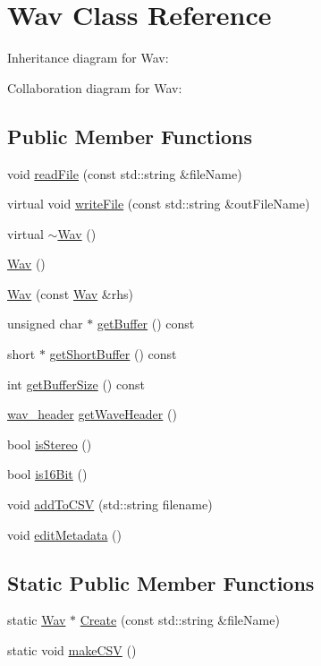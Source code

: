 \hypertarget{classWav}{}\section{Wav Class Reference}
\label{classWav}


Inheritance diagram for Wav\+:


Collaboration diagram for Wav\+:
\subsection*{Public Member Functions}
\begin{DoxyCompactItemize}
\item 
void \hyperlink{classWav_a1c4230cec49d30147a5b8a1950083f7c}{read\+File} (const std\+::string \&file\+Name)
\item 
virtual void \hyperlink{classWav_a7bae34f37288c53cb113e76045f78098}{write\+File} (const std\+::string \&out\+File\+Name)
\item 
virtual \hyperlink{classWav_a1510b246ba121b103a60b8e7839af25f}{$\sim$\+Wav} ()
\item 
\hyperlink{classWav_abe9848ac7af353c82a78f00a600c18e6}{Wav} ()
\item 
\hyperlink{classWav_a8c11f0c7e8573a4c9180e5690ab2a354}{Wav} (const \hyperlink{classWav}{Wav} \&rhs)
\item 
unsigned char $\ast$ \hyperlink{classWav_aa713fc552ec8d011df0acede14d23295}{get\+Buffer} () const
\item 
short $\ast$ \hyperlink{classWav_a24c23c9823a08c0ff1a2a39427b36135}{get\+Short\+Buffer} () const
\item 
int \hyperlink{classWav_a71fdfa1d9f5e7c1b86f07bbff4249dca}{get\+Buffer\+Size} () const
\item 
\hyperlink{structwav__header}{wav\+\_\+header} \hyperlink{classWav_a7b640870f22bd813b1f211c9ef3139ec}{get\+Wave\+Header} ()
\item 
bool \hyperlink{classWav_ad933a085980a47031c91a91f9a3539ff}{is\+Stereo} ()
\item 
bool \hyperlink{classWav_a476a9bed5c03843098b7ecf67d5afeaf}{is16\+Bit} ()
\item 
void \hyperlink{classWav_a6e5d91d38497df976e0ec5d9d391e8e5}{add\+To\+C\+SV} (std\+::string filename)
\item 
void \hyperlink{classWav_af5b4f1d400f83bf349464e3403b765b2}{edit\+Metadata} ()
\end{DoxyCompactItemize}
\subsection*{Static Public Member Functions}
\begin{DoxyCompactItemize}
\item 
static \hyperlink{classWav}{Wav} $\ast$ \hyperlink{classWav_a3f742b0d3f1334a9be65ef264711d34f}{Create} (const std\+::string \&file\+Name)
\item 
static void \hyperlink{classWav_ab2edefac96cd80a22875705ad2533e91}{make\+C\+SV} ()
\end{DoxyCompactItemize}
